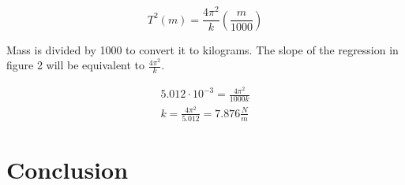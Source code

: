 \documentclass{article}
\begin{document}
\[
T^2(m) = \frac{4\pi^2}{k}(\frac{m}{1000})
\]

Mass is divided by 1000 to convert it to kilograms. The slope of the regression in figure 2 will be equivalent to $\frac{4\pi^2}{k}$.

\begin{gather}
5.012 \cdot 10^{-3} = \frac{4\pi^2}{1000k} \\
k = \frac{4\pi^2}{5.012} = 7.876 \frac{N}{m}
\end{gather}
\linebreak
\linebreak
\linebreak
\linebreak
\section*{Conclusion}
\end{document}
